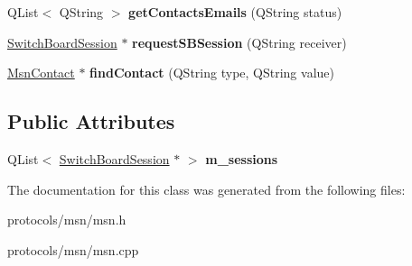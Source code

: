\begin{DoxyCompactItemize}
\item 
\hypertarget{classMsn_a07015e42deec5bf5c2d8666e6e43ccd0}{
QList$<$ QString $>$ {\bfseries getContactsEmails} (QString status)}
\label{classMsn_a07015e42deec5bf5c2d8666e6e43ccd0}

\item 
\hypertarget{classMsn_a12913a2f65c8d7eb15179712aaef5c2d}{
\hyperlink{classSwitchBoardSession}{SwitchBoardSession} $\ast$ {\bfseries requestSBSession} (QString receiver)}
\label{classMsn_a12913a2f65c8d7eb15179712aaef5c2d}

\item 
\hypertarget{classMsn_a7e3bba3d88bb937b2c18daf59a939a38}{
\hyperlink{classMsnContact}{MsnContact} $\ast$ {\bfseries findContact} (QString type, QString value)}
\label{classMsn_a7e3bba3d88bb937b2c18daf59a939a38}

\end{DoxyCompactItemize}
\subsection*{Public Attributes}
\begin{DoxyCompactItemize}
\item 
\hypertarget{classMsn_a0802edd087139a66586fbdfdf1087c9f}{
QList$<$ \hyperlink{classSwitchBoardSession}{SwitchBoardSession} $\ast$ $>$ {\bfseries m\_\-sessions}}
\label{classMsn_a0802edd087139a66586fbdfdf1087c9f}

\end{DoxyCompactItemize}


The documentation for this class was generated from the following files:\begin{DoxyCompactItemize}
\item 
protocols/msn/msn.h\item 
protocols/msn/msn.cpp\end{DoxyCompactItemize}
